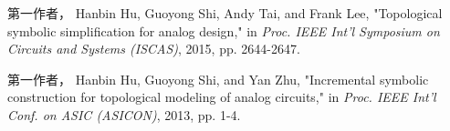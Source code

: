 
\begin{publications}{99}
	\item 
\ifsjtu@review\relax
第一作者，
\else 
Hanbin Hu, Guoyong Shi, Andy Tai, and Frank Lee,
\fi 
"Topological symbolic simplification for analog design," in \textit{Proc. IEEE Int'l Symposium on Circuits and Systems (ISCAS)}, 2015, pp. 2644-2647.
    \item 
\ifsjtu@review\relax
第一作者，
\else 
Hanbin Hu, Guoyong Shi, and Yan Zhu,
\fi 
"Incremental symbolic construction for topological modeling of analog circuits," in \textit{Proc. IEEE Int'l Conf. on ASIC (ASICON)}, 2013, pp. 1-4.
\end{publications}
